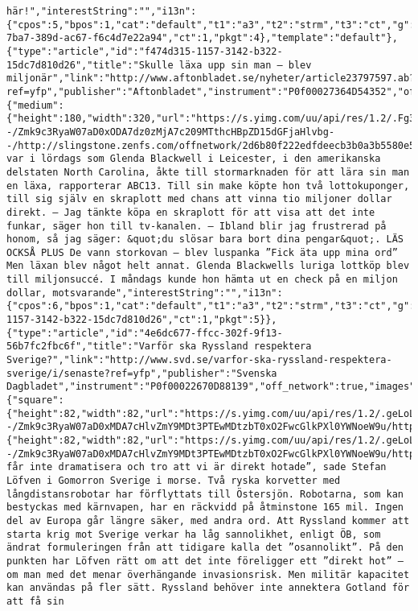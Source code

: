 \begin{verbatim}
här!","interestString":"","i13n":{"cpos":5,"bpos":1,"cat":"default","t1":"a3","t2":"strm","t3":"ct","g":"daf3b8a0-7ba7-389d-ac67-f6c4d7e22a94","ct":1,"pkgt":4},"template":"default"},{"type":"article","id":"f474d315-1157-3142-b322-15dc7d810d26","title":"Skulle läxa upp sin man – blev miljonär","link":"http://www.aftonbladet.se/nyheter/article23797597.ab?ref=yfp","publisher":"Aftonbladet","instrument":"P0f00027364D54352","off_network":true,"images":{"medium":{"height":180,"width":320,"url":"https://s.yimg.com/uu/api/res/1.2/.Fg3W4ZcOX6snBrXJTXKhw--/Zmk9c3RyaW07aD0xODA7dz0zMjA7c209MTthcHBpZD15dGFjaHlvbg--/http://slingstone.zenfs.com/offnetwork/2d6b80f222edfdeecb3b0a3b5580e5e0","defer":1}},"template":"featured","summary":"Det var i lördags som Glenda Blackwell i Leicester, i den amerikanska delstaten North Carolina, åkte till stormarknaden för att lära sin man en läxa, rapporterar ABC13. Till sin make köpte hon två lottokuponger, till sig själv en skraplott med chans att vinna tio miljoner dollar direkt. – Jag tänkte köpa en skraplott för att visa att det inte funkar, säger hon till tv-kanalen. – Ibland blir jag frustrerad på honom, så jag säger: &quot;du slösar bara bort dina pengar&quot;. LÄS OCKSÅ PLUS De vann storkovan – blev luspanka ”Fick äta upp mina ord” Men läxan blev något helt annat. Glenda Blackwells luriga lottköp blev till miljonsuccé. I måndags kunde hon hämta ut en check på en miljon dollar, motsvarande","interestString":"","i13n":{"cpos":6,"bpos":1,"cat":"default","t1":"a3","t2":"strm","t3":"ct","g":"f474d315-1157-3142-b322-15dc7d810d26","ct":1,"pkgt":5}},{"type":"article","id":"4e6dc677-ffcc-302f-9f13-56b7fc2fbc6f","title":"Varför ska Ryssland respektera Sverige?","link":"http://www.svd.se/varfor-ska-ryssland-respektera-sverige/i/senaste?ref=yfp","publisher":"Svenska Dagbladet","instrument":"P0f00022670D88139","off_network":true,"images":{"square":{"height":82,"width":82,"url":"https://s.yimg.com/uu/api/res/1.2/.geLoLnwL5wcc8ki35_cNg--/Zmk9c3RyaW07aD0xMDA7cHlvZmY9MDt3PTEwMDtzbT0xO2FwcGlkPXl0YWNoeW9u/http://slingstone.zenfs.com/offnetwork/04c503dd1fdf5ef13e7dabb29f6b9910","defer":1}},"image":{"height":82,"width":82,"url":"https://s.yimg.com/uu/api/res/1.2/.geLoLnwL5wcc8ki35_cNg--/Zmk9c3RyaW07aD0xMDA7cHlvZmY9MDt3PTEwMDtzbT0xO2FwcGlkPXl0YWNoeW9u/http://slingstone.zenfs.com/offnetwork/04c503dd1fdf5ef13e7dabb29f6b9910","defer":1},"summary":"Vi får inte dramatisera och tro att vi är direkt hotade”, sade Stefan Löfven i Gomorron Sverige i morse. Två ryska korvetter med långdistansrobotar har förflyttats till Östersjön. Robotarna, som kan bestyckas med kärnvapen, har en räckvidd på åtminstone 165 mil. Ingen del av Europa går längre säker, med andra ord. Att Ryssland kommer att starta krig mot Sverige verkar ha låg sannolikhet, enligt ÖB, som ändrat formuleringen från att tidigare kalla det ”osannolikt”. På den punkten har Löfven rätt om att det inte föreligger ett ”direkt hot” – om man med det menar överhängande invasionsrisk. Men militär kapacitet kan användas på fler sätt. Ryssland behöver inte annektera Gotland för att få sin 
\end{verbatim}
